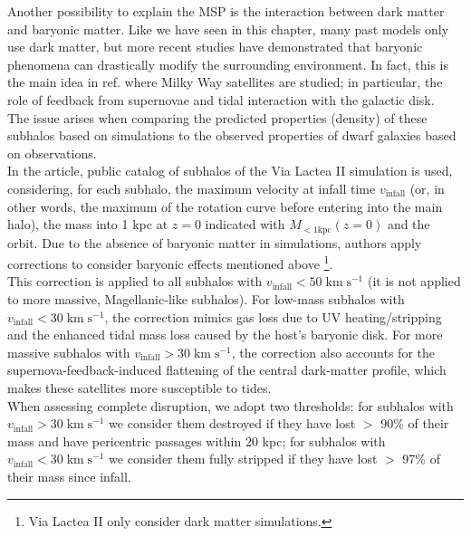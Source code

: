 Another possibility to explain the MSP is the interaction between dark matter and baryonic matter. Like we have seen in this chapter, many past models only use dark matter, but more recent studies have demonstrated that baryonic phenomena can drastically modify the surrounding environment. In fact, this is the main idea in ref. \cite{A_BARYONIC_SOLUTION_TO_THE_MISSING_SATELLITES_PROBLEM} where Milky Way satellites are studied; in particular, the role of feedback from supernovae and tidal interaction with the galactic disk.\\ The issue arises when comparing the predicted properties (density) of these subhalos based on simulations to the observed properties of dwarf galaxies based on observations.\\ 
In the article, public catalog of subhalos of the Via Lactea II simulation is used, considering, for each subhalo, the maximum velocity at infall time $v_{\text{infall}}$ (or, in other words, the maximum of the rotation curve before entering into the main halo), the mass into 1 kpc at $z=0$ indicated with $M_{<1\text{kpc}}(z=0)$ and the orbit.
Due to the absence of baryonic matter in simulations, authors apply corrections to consider baryonic effects mentioned above \footnote{Via Lactea II only consider dark matter simulations.}.\\
This correction is applied to all subhalos with $v_{\text{infall}}<50\;\text{km}\;\text{s}^{-1}$ (it is not applied to more massive, Magellanic-like subhalos). For low-mass subhalos with $v_{\text{infall}} < 30 \; \text{km} \; \text{s}^{-1}$, the correction mimics gas loss due to UV heating/stripping and the enhanced tidal mass loss caused by the host’s baryonic disk. For more massive subhalos with $v_{\text{infall}} > 30 \; \text{km} \; \text{s}^{-1}$, the correction also accounts for the supernova-feedback-induced flattening of the central dark-matter profile, which makes these satellites more susceptible to tides.\\ When assessing complete disruption, we adopt two thresholds: for subhalos with $v_{\text{infall}} > 30 \; \text{km} \; \text{s}^{-1}$ we consider them destroyed if they have lost $>$ 90\;\% of their mass and have pericentric passages within 20 kpc; for subhalos with $v_{\text{infall}} < 30 \; \text{km} \; \text{s}^{-1}$ we consider them fully stripped if they have lost $>$ 97\;\% of their mass since infall.\\

